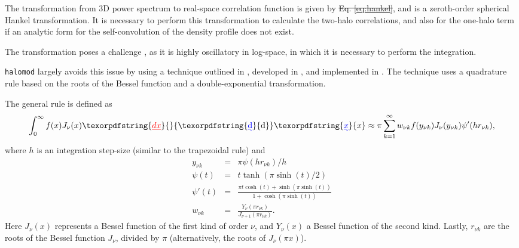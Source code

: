 \documentclass[5p,aas_macros]{elsarticle}
\providecommand{\DIFaddtex}[1]{{\protect\color{blue}\uwave{#1}}} %
\providecommand{\DIFdeltex}[1]{{\protect\color{red}\sout{#1}}}                      %
\providecommand{\DIFaddbegin}{} %
\providecommand{\DIFaddend}{} %
\providecommand{\DIFdelbegin}{} %
\providecommand{\DIFdelend}{} %
\providecommand{\DIFadd}[1]{\texorpdfstring{\DIFaddtex{#1}}{#1}} %
\providecommand{\DIFdel}[1]{\texorpdfstring{\DIFdeltex{#1}}{}} %
\begin{document}
The transformation from 3D power spectrum to real-space correlation function is given by \DIFdelbegin \DIFdel{Eq. \ref{eq:hankel}}\DIFdelend \DIFaddbegin \DIFadd{\mbox{%
\cref{eq:hankel}}\hspace{0pt}%
}\DIFaddend , and is a zeroth-order spherical Hankel transformation.
It is necessary to perform this transformation to calculate the two-halo correlations, and also for the one-halo term if an analytic form for the self-convolution of the density profile does not exist. 

The transformation poses a challenge \citep[eg.][]{Diemer2018}, as it is highly oscillatory in log-space, in which it is necessary to perform the integration.

\verb|halomod| largely avoids this issue by using a technique outlined in \cite{Szapudi2005}, developed in \cite{Ogata2005}, and implemented in \cite{Murray2019}. 
The technique uses a quadrature rule based on the roots of the Bessel function and a double-exponential transformation. 

The general rule is defined as
\begin{equation}
	\label{eq:hankeltrans}
	\int_0^\infty f(x)J_\nu(x) \DIFdelbegin \DIFdel{dx }\DIFdelend \DIFaddbegin {\rm \DIFadd{d}}\DIFadd{x }\DIFaddend \approx \pi \sum_{k=1}^\infty w_{\nu k} f(y_{\nu k})J_\nu(y_{\nu k})\psi'(hr_{\nu k}),
\end{equation}
where $h$ is an integration step-size (similar to the trapezoidal rule) and
\begin{eqnarray}
	y_{\nu k} &=& \pi \psi(hr_{\nu k})/h \\
	\psi(t) &=& t\tanh(\pi \sinh(t)/2) \\
	\psi'(t) &=& \frac{\pi t \cosh(t) + \sinh(\pi \sinh(t))}{ 1 + \cosh(\pi \sinh(t))} \\
	w_{\nu k} &=& \frac{Y_\nu(\pi r_{\nu k})}{J_{\nu+1}(\pi r_{\nu k})}.
\end{eqnarray}
Here $J_\nu(x)$ represents a Bessel function of the first kind of order $\nu$, and $Y_\nu(x)$ a Bessel function of the second kind. Lastly, $r_{\nu k}$ are the roots of the Bessel function $J_\nu$, divided by $\pi$ (alternatively, the roots of $J_\nu(\pi x)$).
\end{document}
